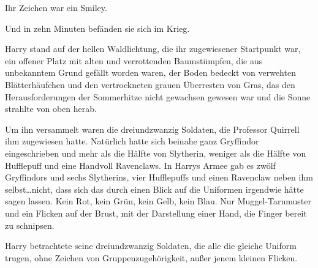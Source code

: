 Ihr Zeichen war ein Smiley.

Und in zehn Minuten befänden sie sich im Krieg.

Harry stand auf der hellen Waldlichtung, die ihr zugewiesener Startpunkt war, ein offener Platz mit alten und verrottenden Baumstümpfen, die aus unbekanntem Grund gefällt worden waren, der Boden bedeckt von verwehten Blätterhäufchen und den vertrockneten grauen Überresten von Gras, das den Herausforderungen der Sommerhitze nicht gewachsen gewesen war und die Sonne strahlte von oben herab.

Um ihn versammelt waren die dreiundzwanzig Soldaten, die Professor Quirrell ihm zugewiesen hatte. Natürlich hatte sich beinahe ganz Gryffindor eingeschrieben und mehr als die Hälfte von Slytherin, weniger als die Hälfte von Hufflepuff und eine Handvoll Ravenclaws. In Harrys Armee gab es zwölf Gryffindors und sechs Slytherins, vier Hufflepuffs und einen Ravenclaw neben ihm selbst…nicht, dass sich das durch einen Blick auf die Uniformen irgendwie hätte sagen lassen. Kein Rot, kein Grün, kein Gelb, kein Blau. Nur Muggel-Tarnmuster und ein Flicken auf der Brust, mit der Darstellung einer Hand, die Finger bereit zu schnipsen.

Harry betrachtete seine dreiundzwanzig Soldaten, die alle die gleiche Uniform trugen, ohne Zeichen von Gruppenzugehörigkeit, außer jenem kleinen Flicken.

